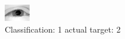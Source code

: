 \begin{figure}[h!]
\begin{center}
\includegraphics[width=0.60\columnwidth]{figures/ID2320_class_1_target_2.png}
\end{center}
\caption{ Classification: 1 actual target: 2}
\label{fig:ID2320_class_1_target_2}
\end{figure}
